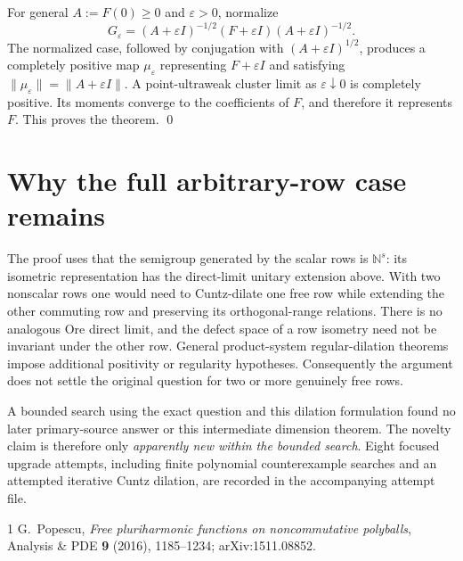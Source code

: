 \documentclass[10pt]{article}
\newcommand{\N}{\mathbb N}
\begin{document}
For general $A:=F(0)\ge0$ and $\varepsilon>0$, normalize
\[
 G_\varepsilon=(A+\varepsilon I)^{-1/2}
 (F+\varepsilon I)(A+\varepsilon I)^{-1/2}.
\]
The normalized case, followed by conjugation with
$(A+\varepsilon I)^{1/2}$, produces a completely positive map
$\mu_\varepsilon$ representing $F+\varepsilon I$ and satisfying
$\|\mu_\varepsilon\|=\|A+\varepsilon I\|$.  A point-ultraweak cluster limit
as $\varepsilon\downarrow0$ is completely positive.  Its moments converge to
the coefficients of $F$, and therefore it represents $F$.  This proves the
theorem. \qed

\section{Why the full arbitrary-row case remains}

The proof uses that the semigroup generated by the scalar rows is $\N^s$:
its isometric representation has the direct-limit unitary extension above.
With two nonscalar rows one would need to Cuntz-dilate one free row while
extending the other commuting row and preserving its orthogonal-range
relations.  There is no analogous Ore direct limit, and the defect space of a
row isometry need not be invariant under the other row.  General
product-system regular-dilation theorems impose additional positivity or
regularity hypotheses.  Consequently the argument does not settle the
original question for two or more genuinely free rows.

A bounded search using the exact question and this dilation formulation found
no later primary-source answer or this intermediate dimension theorem.  The
novelty claim is therefore only \emph{apparently new within the bounded
search}.  Eight focused upgrade attempts, including finite polynomial
counterexample searches and an attempted iterative Cuntz dilation, are
recorded in the accompanying attempt file.

\begin{thebibliography}{1}
G.~Popescu, \emph{Free pluriharmonic functions on noncommutative polyballs},
Analysis \& PDE \textbf{9} (2016), 1185--1234;
arXiv:1511.08852.
\end{thebibliography}
\end{document}
